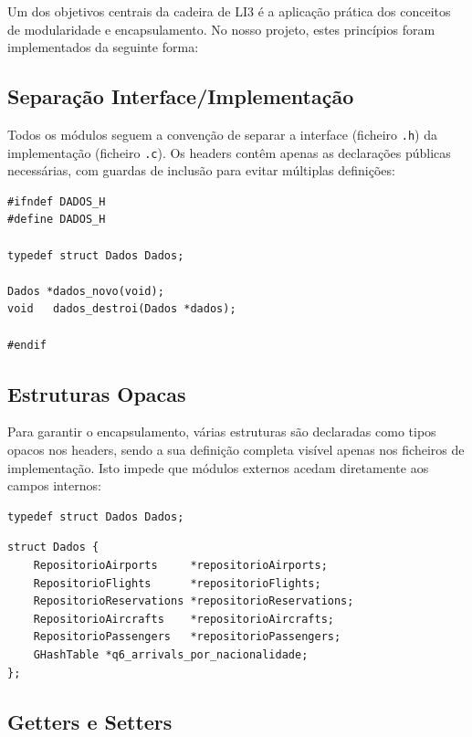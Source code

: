 \documentclass[a4paper,12pt]{scrreprt}
\begin{document}
Um dos objetivos centrais da cadeira de LI3 é a aplicação prática dos conceitos de modularidade e encapsulamento. No nosso projeto, estes princípios foram implementados da seguinte forma:

\subsection{Separação Interface/Implementação}

Todos os módulos seguem a convenção de separar a interface (ficheiro \texttt{.h}) da implementação (ficheiro \texttt{.c}). Os headers contêm apenas as declarações públicas necessárias, com guardas de inclusão para evitar múltiplas definições:

\begin{lstlisting}[caption={Exemplo de header com guarda de inclusão}]
#ifndef DADOS_H
#define DADOS_H

typedef struct Dados Dados;

Dados *dados_novo(void);
void   dados_destroi(Dados *dados);

#endif
\end{lstlisting}

\subsection{Estruturas Opacas}

Para garantir o encapsulamento, várias estruturas são declaradas como tipos opacos nos headers, sendo a sua definição completa visível apenas nos ficheiros de implementação. Isto impede que módulos externos acedam diretamente aos campos internos:

\begin{lstlisting}[caption={Estrutura opaca - declaração no header}]
typedef struct Dados Dados;
\end{lstlisting}

\begin{lstlisting}[caption={Estrutura opaca - definição no .c}]
struct Dados {
    RepositorioAirports     *repositorioAirports;
    RepositorioFlights      *repositorioFlights;
    RepositorioReservations *repositorioReservations;
    RepositorioAircrafts    *repositorioAircrafts;
    RepositorioPassengers   *repositorioPassengers;
    GHashTable *q6_arrivals_por_nacionalidade;
};
\end{lstlisting}

\subsection{Getters e Setters}
\end{document}
